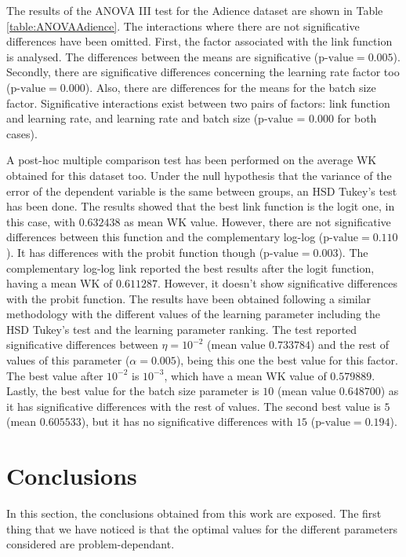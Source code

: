 \documentclass[10pt, a4paper, titlepage, twocolumn]{article}
\begin{document}
	The results of the ANOVA III test for the Adience dataset are shown in Table \ref{table:ANOVAAdience}. The interactions where there are not significative differences have been omitted. First, the factor associated with the link function is analysed. The differences between the means are significative ($\text{p-value} = 0.005$). Secondly, there are significative differences concerning the learning rate factor too ($\text{p-value} = 0.000$). Also, there are differences for the means for the batch size factor. Significative interactions exist between two pairs of factors: link function and learning rate, and learning rate and batch size ($\text{p-value = 0.000}$ for both cases).
	
	A post-hoc multiple comparison test has been performed on the average WK obtained for this dataset too. Under the null hypothesis that the variance of the error of the dependent variable is the same between groups, an HSD Tukey's test has been done. The results showed that the best link function is the logit one, in this case, with $0.632438$ as mean WK value. However, there are not significative differences between this function and the complementary log-log ($\text{p-value}=0.110$). It has differences with the probit function though ($\text{p-value} = 0.003$). The complementary log-log link reported the best results after the logit function, having a mean WK of $0.611287$. However, it doesn't show significative differences with the probit function.
	The results have been obtained following a similar methodology with the different values of the learning parameter including the HSD Tukey's test and the learning parameter ranking. The test reported significative differences between $\eta=10^{-2}$ (mean value $0.733784$) and the rest of values of this parameter ($\alpha=0.005$), being this one the best value for this factor. The best value after $10^{-2}$ is $10^{-3}$, which have a mean WK value of $0.579889$. Lastly, the best value for the batch size parameter is $10$ (mean value $0.648700$) as it has significative differences with the rest of values. The second best value is $5$ (mean $0.605533$), but it has no significative differences with $15$ ($\text{p-value}= 0.194$).
	
	\section{Conclusions}
	\label{sect:conclusions}
	In this section, the conclusions obtained from this work are exposed. The first thing that we have noticed is that the optimal values for the different parameters considered are problem-dependant. 
	
\end{document}
